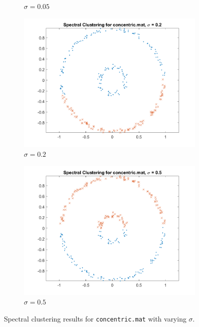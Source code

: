 \documentclass[11pt]{article}
\begin{document}
\begin{figure}[!ht]
\begin{subfigure}{0.45\textwidth}
        \caption{\(\sigma = 0.05\)}
    \end{subfigure}
    \begin{subfigure}{0.45\textwidth}
        \includegraphics[width=\linewidth]{concentric_sigma_0.200.png}
        \caption{\(\sigma = 0.2\)}
    \end{subfigure}
    \begin{subfigure}{0.45\textwidth}
        \includegraphics[width=\linewidth]{concentric_sigma_0.500.png}
        \caption{\(\sigma = 0.5\)}
    \end{subfigure}
    \caption{Spectral clustering results for \texttt{concentric.mat} with varying \(\sigma\).}
    \label{fig:concentric}
\end{figure}
\end{document}
